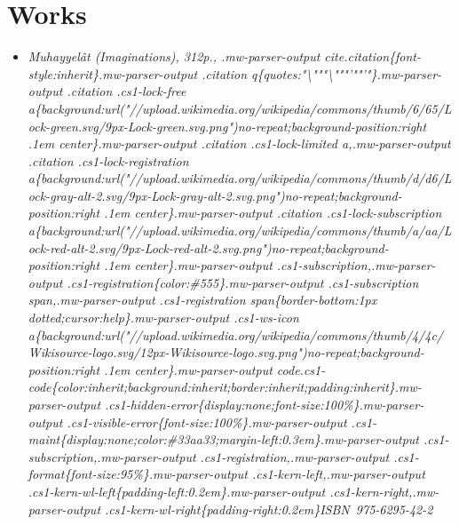 \section{Works}\label{works}

\begin{itemize}
\item
  \emph{Muhayyelât (Imaginations), 312p., .mw-parser-output
  cite.citation\{font-style:inherit\}.mw-parser-output .citation
  q\{quotes:"\textbackslash{}"""\textbackslash{}"""'""'"\}.mw-parser-output
  .citation .cs1-lock-free
  a\{background:url("//upload.wikimedia.org/wikipedia/commons/thumb/6/65/Lock-green.svg/9px-Lock-green.svg.png")no-repeat;background-position:right
  .1em center\}.mw-parser-output .citation .cs1-lock-limited
  a,.mw-parser-output .citation .cs1-lock-registration
  a\{background:url("//upload.wikimedia.org/wikipedia/commons/thumb/d/d6/Lock-gray-alt-2.svg/9px-Lock-gray-alt-2.svg.png")no-repeat;background-position:right
  .1em center\}.mw-parser-output .citation .cs1-lock-subscription
  a\{background:url("//upload.wikimedia.org/wikipedia/commons/thumb/a/aa/Lock-red-alt-2.svg/9px-Lock-red-alt-2.svg.png")no-repeat;background-position:right
  .1em center\}.mw-parser-output .cs1-subscription,.mw-parser-output
  .cs1-registration\{color:\#555\}.mw-parser-output .cs1-subscription
  span,.mw-parser-output .cs1-registration span\{border-bottom:1px
  dotted;cursor:help\}.mw-parser-output .cs1-ws-icon
  a\{background:url("//upload.wikimedia.org/wikipedia/commons/thumb/4/4c/Wikisource-logo.svg/12px-Wikisource-logo.svg.png")no-repeat;background-position:right
  .1em center\}.mw-parser-output
  code.cs1-code\{color:inherit;background:inherit;border:inherit;padding:inherit\}.mw-parser-output
  .cs1-hidden-error\{display:none;font-size:100\%\}.mw-parser-output
  .cs1-visible-error\{font-size:100\%\}.mw-parser-output
  .cs1-maint\{display:none;color:\#33aa33;margin-left:0.3em\}.mw-parser-output
  .cs1-subscription,.mw-parser-output
  .cs1-registration,.mw-parser-output
  .cs1-format\{font-size:95\%\}.mw-parser-output
  .cs1-kern-left,.mw-parser-output
  .cs1-kern-wl-left\{padding-left:0.2em\}.mw-parser-output
  .cs1-kern-right,.mw-parser-output
  .cs1-kern-wl-right\{padding-right:0.2em\}ISBN~975-6295-42-2}
\end{itemize}

